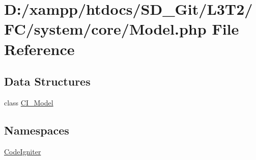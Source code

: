\hypertarget{system_2core_2_model_8php}{}\section{D\+:/xampp/htdocs/\+S\+D\+\_\+\+Git/\+L3\+T2/\+F\+C/system/core/\+Model.php File Reference}
\label{system_2core_2_model_8php}
\subsection*{Data Structures}
\begin{DoxyCompactItemize}
\item 
class \hyperlink{class_c_i___model}{C\+I\+\_\+\+Model}
\end{DoxyCompactItemize}
\subsection*{Namespaces}
\begin{DoxyCompactItemize}
\item 
 \hyperlink{namespace_code_igniter}{Code\+Igniter}
\end{DoxyCompactItemize}
